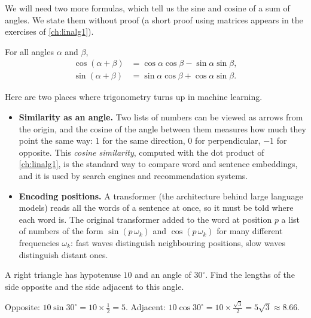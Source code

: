 We will need two more formulas, which tell us the sine and cosine of a sum of
angles. We state them without proof (a short proof using matrices appears in
the exercises of \cref{ch:linalg1}).

\begin{theorem}\label{thm:angle-addition}
For all angles $\alpha$ and $\beta$,
\begin{align*}
  \cos(\alpha + \beta) &= \cos\alpha\cos\beta - \sin\alpha\sin\beta,\\
  \sin(\alpha + \beta) &= \sin\alpha\cos\beta + \cos\alpha\sin\beta .
\end{align*}
\end{theorem}

\begin{mlnote}
Here are two places where trigonometry turns up in machine learning.
\begin{itemize}
  \item \textbf{Similarity as an angle.} Two lists of numbers can be viewed as
    arrows from the origin, and the cosine of the angle between them measures
    how much they point the same way: $1$ for the same direction, $0$ for
    perpendicular, $-1$ for opposite. This \emph{cosine similarity}, computed
    with the dot product of \cref{ch:linalg1}, is the standard way to compare
    word and sentence embeddings, and it is used by search engines and
    recommendation systems.
  \item \textbf{Encoding positions.} A transformer (the architecture behind
    large language models) reads all the words of a sentence at once, so it
    must be told where each word is. The original transformer added to the
    word at position $p$ a list of numbers of the form $\sin(p\,\omega_k)$ and
    $\cos(p\,\omega_k)$ for many different frequencies $\omega_k$: fast waves
    distinguish neighbouring positions, slow waves distinguish distant ones.
\end{itemize}
\end{mlnote}

\sectionexercises

\begin{exercise}
A right triangle has hypotenuse $10$ and an angle of $30^\circ$. Find the
lengths of the side opposite and the side adjacent to this angle.
\end{exercise}
\begin{solution}
Opposite: $10\sin30^\circ = 10 \times \tfrac12 = 5$. Adjacent:
$10\cos30^\circ = 10\times\tfrac{\sqrt3}{2} = 5\sqrt3 \approx 8.66$.
\end{solution}

